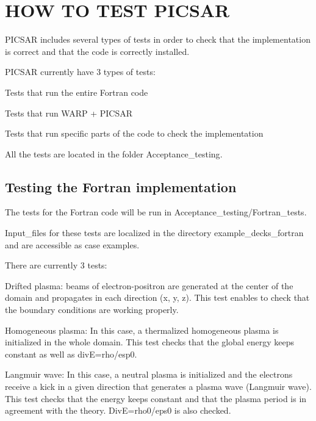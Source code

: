 \section*{H\+OW TO T\+E\+ST P\+I\+C\+S\+AR }

P\+I\+C\+S\+AR includes several types of tests in order to check that the implementation is correct and that the code is correctly installed.

P\+I\+C\+S\+AR currently have 3 types of tests\+:


\begin{DoxyItemize}
\item Tests that run the entire Fortran code
\item Tests that run W\+A\+RP + P\+I\+C\+S\+AR
\item Tests that run specific parts of the code to check the implementation
\end{DoxyItemize}

All the tests are located in the folder {\ttfamily Acceptance\+\_\+testing}.

\subsection*{Testing the Fortran implementation }

The tests for the Fortran code will be run in {\ttfamily Acceptance\+\_\+testing/\+Fortran\+\_\+tests}.

Input\+\_\+files for these tests are localized in the directory {\ttfamily example\+\_\+decks\+\_\+fortran} and are accessible as case examples.

There are currently 3 tests\+:


\begin{DoxyItemize}
\item Drifted plasma\+: beams of electron-\/positron are generated at the center of the domain and propagates in each direction (x, y, z). This test enables to check that the boundary conditions are working properly.
\item Homogeneous plasma\+: In this case, a thermalized homogeneous plasma is initialized in the whole domain. This test checks that the global energy keeps constant as well as divE=rho/esp0.
\item Langmuir wave\+: In this case, a neutral plasma is initialized and the electrons receive a kick in a given direction that generates a plasma wave (Langmuir wave). This test checks that the energy keeps constant and that the plasma period is in agreement with the theory. DivE=rho0/eps0 is also checked.
\end{DoxyItemize}

